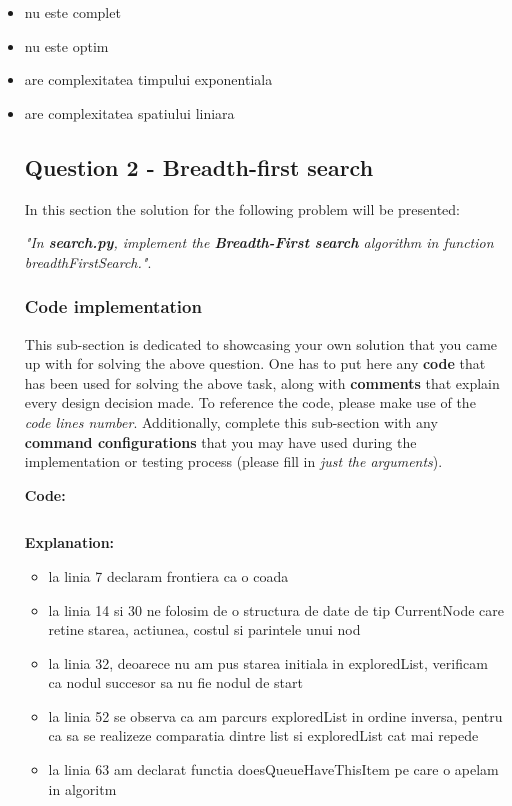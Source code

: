 \begin{itemize}
\item  nu este complet
\item  nu este optim
\item are complexitatea timpului exponentiala 
\item are complexitatea spatiului liniara

\vspace{0.75cm}

\subsection{Question 2 - Breadth-first search}
In this section the solution for the following problem will be presented:\newline


\textit{"In \textbf{search.py}, implement the \textbf{Breadth-First search} algorithm in function \textit{breadthFirstSearch}."}.


\subsubsection{Code implementation}
This sub-section is dedicated to showcasing your own solution that you came up with for solving the above question. One has to put here any \textbf{code} that has been used for solving the above task, along with \textbf{comments} that explain every design decision made. To reference the code, please make use of the \textit{code lines number}. Additionally, complete this sub-section with any \textbf{command configurations} that you may have used during the implementation or testing process (please fill in \textit{just the arguments}). \newline


\textbf{Code:}
\inputminted[linenos]{python}{code/02_bfs.py}


\textbf{Explanation:}
\begin{itemize}
    \setlength\itemsep{0em}
    \item la linia 7 declaram frontiera ca o coada
    \item la linia 14 si 30 ne folosim de o structura de date de tip CurrentNode care retine starea, actiunea, costul si parintele unui nod
    \item la linia 32, deoarece nu am pus starea initiala in exploredList, verificam ca nodul succesor sa nu fie nodul de start
    \item la linia 52 se observa ca am parcurs exploredList in ordine inversa, pentru ca sa se realizeze comparatia dintre list si exploredList cat mai repede
    \item la linia 63 am declarat functia doesQueueHaveThisItem pe care o apelam in algoritm %


\end{itemize}
\end{itemize}

